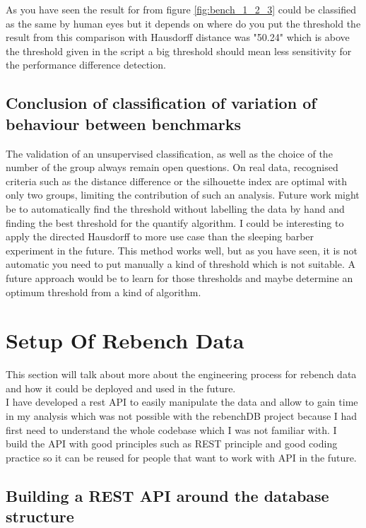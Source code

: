 \documentclass{article}
\begin{document}
As you have seen the result for from figure \ref{fig:bench_1_2_3} could be classified as the same by human eyes but it depends on where do you put the threshold the result from this comparison with Hausdorff distance was "50.24" which is above the threshold given in the script a big threshold should mean less sensitivity for the performance difference detection.\\

\pagebreak
\newpage


\subsection{Conclusion of classification of variation of behaviour between benchmarks}

The validation of an unsupervised classification, as well as the choice of the number of the group always remain open questions. On real data, recognised criteria such as the distance difference or the silhouette index are optimal with only two groups, limiting the contribution of such an analysis.
Future work might be to automatically find the threshold without labelling the data by hand and finding the best threshold for the quantify algorithm.
I could be interesting to apply the directed Hausdorff to more use case than the sleeping barber experiment in the future.
This method works well, but as you have seen, it is not automatic you need to put manually a kind of threshold which is not suitable.
A future approach would be to learn for those thresholds and maybe determine an optimum threshold from a kind of algorithm.



\section{Setup Of Rebench Data}
This section will talk about more about the engineering process for rebench data and how it could be deployed and used in the future.\\
I have developed a rest API to easily manipulate the data and allow to gain time in my analysis which was not possible with the rebenchDB project because I had first need to understand the whole codebase which I was not familiar with. I build the API with good principles such as REST principle and good coding practice so it can be reused for people that want to work with API in the future.

\subsection{Building a REST API around the database structure}
\end{document}
